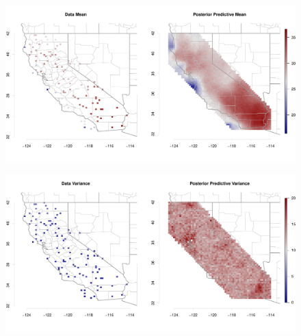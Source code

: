 \documentclass[11pt]{article}
\def\beginmyfig{\begin{figure}[h]\center}
\def\endmyfig{\end{figure}}
\begin{document}
\beginmyfig
  \includegraphics[scale=.5]{../graphs/postpredmean.pdf}
  \caption{}
  \label{fig:postpred}
\endmyfig

\beginmyfig
  \includegraphics[scale=.5]{../graphs/postpredvar.pdf}
  \caption{}
  \label{fig:datmean}
\endmyfig

\end{document}
